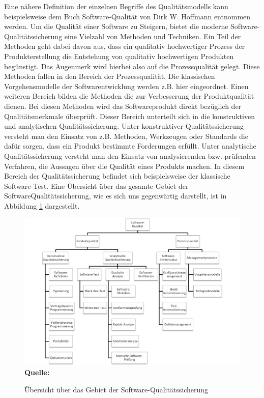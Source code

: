 Eine nähere Definition der einzelnen Begriffe des Qualitätsmodells kann beispielsweise dem Buch Software-Qualität von Dirk W. Hoffmann entnommen werden. \cite[Seite 7 ff.]{hoffmann_software-qualitat_2013}
Um die Qualität einer Software zu Steigern, bietet die moderne Software-Qualitätssicherung eine Vielzahl von Methoden und Techniken.
Ein Teil der Methoden geht dabei davon
aus, dass ein qualitativ hochwertiger Prozess der Produkterstellung die Entstehung von qualitativ hochwertigen Produkten begünstigt. Das Augenmerk wird hierbei also auf die Prozessqualität gelegt. Diese Methoden fallen in den Bereich der Prozessqualität.
Die klassischen Vorgehensmodelle der Softwarentwicklung
werden z.B. hier eingeordnet. Einen weiteren Bereich bilden die Methoden die zur Verbesserung der  Produktqualität dienen. Bei diesen Methoden wird das Softwareprodukt direkt bezüglich der Qualitätsmerkmale überprüft. Dieser Bereich unterteilt sich in die konstruktiven und analytischen Qualitätssicherung. Unter konstruktiver Qualitätssicherung versteht man den Einsatz von z.B. Methoden, Werkzeugen oder Standards die
dafür sorgen, dass ein Produkt bestimmte Forderungen erfüllt. 
Unter analytische Qualitätssicherung versteht man den Einsatz von analysierenden bzw. prüfenden Verfahren, die Aussagen
über die Qualität eines Produkts machen.
In diesem Bereich der Qualitätssicherung befindet sich beispielsweise der klassische Software-Test.\cite[vgl. Seite 19 ff.]{hoffmann_software-qualitat_2013} Eine Übersicht über das gesamte Gebiet der SoftwareQualitätssicherung, wie es sich uns gegenwärtig darstellt, ist in Abbildung \ref{fig:softwareQualitätssicherung} dargestellt. 
\begin{figure}[htb]
  \centering  
  \includegraphics[scale=0.7]{img/softwarequalitaet.png}\\
  \footnotesize\sffamily\textbf{Quelle:} \cite[vgl. Seite 20]{hoffmann_software-qualitat_2013}
  \caption{Übersicht über das Gebiet der Software-Qualitätssicherung}
  \label{fig:softwareQualitätssicherung}
\end{figure}



